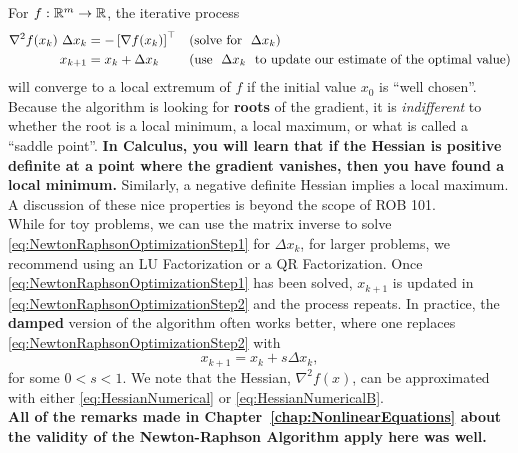 \begin{tcolorbox}[sharp corners, colback=green!30, colframe=green!80!blue,title=\textbf{ \Large Optimization as a Form of Root Finding: Vector Decision Variables}]
 For $f:\mathbb R^m \to \mathbb R$, the iterative process
\begin{align}
\label{eq:NewtonRaphsonOptimizationStep1}
\nabla^2 f(x_k)~ \Delta x_{k} &= - \left[\nabla f(x_k) \right]^\top \hspace*{0.3cm}(\text{solve for}~~\Delta x_k)  \\
\label{eq:NewtonRaphsonOptimizationStep2}
x_{k+1}&= x_k + \Delta x_{k}~~\hspace*{0.57cm}(\text{use~~} \Delta x_k ~~\text{to update our estimate of the optimal value})
\end{align}
will converge to a local extremum of $f$ if the initial value $x_0$ is ``well chosen''. Because the algorithm is looking for \textbf{roots} of the gradient, it is \textit{indifferent} to whether the root is a local minimum, a local maximum, or what is called a ``saddle point''. \textbf{In Calculus, you will learn that if the Hessian is positive definite at a point where the gradient vanishes, then you have found a local minimum.} Similarly, a negative definite Hessian implies a local maximum. A discussion of these nice properties is beyond the scope of ROB 101.\\


While for toy problems, we can use the matrix inverse to solve \eqref{eq:NewtonRaphsonOptimizationStep1} for $\Delta x_{k}$, for larger problems, we recommend using an LU Factorization or a QR Factorization. Once \eqref{eq:NewtonRaphsonOptimizationStep1}  has been solved, $x_{k+1}$ is updated in \eqref{eq:NewtonRaphsonOptimizationStep2} and the process repeats.
In practice, the \textbf{damped} version of the algorithm often works better, where one replaces \eqref{eq:NewtonRaphsonOptimizationStep2} with   
\begin{equation}
    \label{eq:NewtonRaphsonOptimizationStep3}
x_{k+1}= x_k + s \Delta x_{k},
\end{equation}
for some $0< s < 1$. We note that the Hessian, $\nabla^2f(x)$, can be approximated with either \eqref{eq:HessianNumerical} or \eqref{eq:HessianNumericalB}.\\

\textbf{All of the remarks made in Chapter~\ref{chap:NonlinearEquations} about the validity of the Newton-Raphson Algorithm apply here was well.}\\

\end{tcolorbox}

